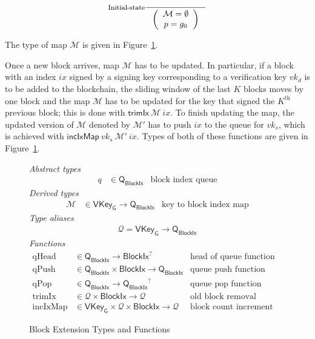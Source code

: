 \documentclass[11pt,a4paper]{article}
\newcommand{\fun}[1]{\mathsf{#1}}
\newcommand{\type}[1]{\mathsf{#1}}
\newcommand{\BlockIx}{\type{BlockIx}}
\newcommand{\Queue}{\type{Q}}
\newcommand{\VKeyGen}{\type{VKey_G}}
\newcommand{\signmapname}{\mathcal{M}}
\newcommand{\trimixname}{trimIx}
\newcommand{\incixmapname}{incIxMap}
\newcommand{\trimix}[2]{\fun{\trimixname} ~ #1 ~ #2}
\newcommand{\incixmap}[3]{\fun{\incixmapname} ~ #1 ~ #2 ~ #3}
\newcommand{\totalf}{\to}
\newcommand{\mapqueue}{\mathcal{Q}}
\begin{document}
\begin{equation}
  \label{eq:init-signed-blocks}
  \inference[Initial-state]
  {}
  {\left(
      {\begin{array}{c}
        \signmapname = \emptyset \\
        p = g_0
      \end{array}}
  \right)
  }
\end{equation}

The type of map $\signmapname$ is given in
Figure~\ref{fig:block-ext-types-funs}.

Once a new block arrives, map $\signmapname$ has to be updated.
%
In particular, if a block with an index $ix$ signed by a signing key
corresponding to a verification key $vk_d$ is to be added to the blockchain,
the sliding window of the last $K$ blocks moves by one block and the map
$\signmapname$ has to be updated for the key that signed the $K^{\text{th}}$
previous block;
%
this is done with $\trimix{\signmapname}{ix}$.
%
To finish updating the map, the updated version of $\signmapname$ denoted by
$\signmapname'$ has to push $ix$ to the queue for $vk_s$, which is achieved
with $\incixmap{vk_s}{\signmapname'}{ix}$.
%
Types of both of these functions are given in
Figure~\ref{fig:block-ext-types-funs}.


\begin{figure}
  \emph{Abstract types}
  \begin{align*}
    q & \in \Queue_\BlockIx  & \text{block index queue}
  \end{align*}
  \emph{Derived types}
  \begin{align*}
    \signmapname & \in \VKeyGen \totalf \Queue_\BlockIx & \text{key to block index map}
  \end{align*}
  \emph{Type aliases}
  \begin{align*}
    \mapqueue = \VKeyGen \totalf \Queue_\BlockIx
  \end{align*}
  \emph{Functions}
  \begin{align*}
    \text{qHead} & \in \Queue_\BlockIx \totalf \BlockIx^? & \text{head of queue function} \\
    \text{qPush} & \in \Queue_\BlockIx \times \BlockIx \totalf \Queue_\BlockIx
      & \text{queue push function} \\
    \text{qPop} & \in \Queue_\BlockIx \totalf {\Queue_\BlockIx}^?
      & \text{queue pop function} \\
    \text{\trimixname} & \in \mapqueue \times \BlockIx \totalf \mapqueue
      & \text{old block removal function} \\
    \text{\incixmapname} & \in \VKeyGen \times \mapqueue \times \BlockIx \totalf \mapqueue
      & \text{block count increment function}
  \end{align*}
  \caption{Block Extension Types and Functions}
  \label{fig:block-ext-types-funs}
\end{figure}
\end{document}
